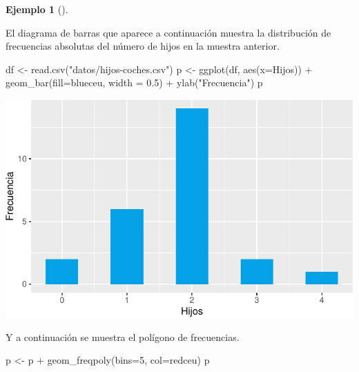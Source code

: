 \documentclass[
  a4paper,
]{scrreport}
\newenvironment{Shaded}{\begin{snugshade}}{\end{snugshade}}
\newcommand{\AttributeTok}[1]{\textcolor[rgb]{0.40,0.45,0.13}{#1}}
\newcommand{\DecValTok}[1]{\textcolor[rgb]{0.68,0.00,0.00}{#1}}
\newcommand{\FloatTok}[1]{\textcolor[rgb]{0.68,0.00,0.00}{#1}}
\newcommand{\FunctionTok}[1]{\textcolor[rgb]{0.28,0.35,0.67}{#1}}
\newcommand{\NormalTok}[1]{\textcolor[rgb]{0.00,0.23,0.31}{#1}}
\newcommand{\OtherTok}[1]{\textcolor[rgb]{0.00,0.23,0.31}{#1}}
\newcommand{\SpecialCharTok}[1]{\textcolor[rgb]{0.37,0.37,0.37}{#1}}
\newcommand{\StringTok}[1]{\textcolor[rgb]{0.13,0.47,0.30}{#1}}
\theoremstyle{plain}
\theoremstyle{definition}
\theoremstyle{definition}
\newtheorem{example}{Ejemplo}[chapter]
\theoremstyle{remark}
\begin{document}
\begin{example}[]\protect\hypertarget{exm-diagrama-barras}{}\label{exm-diagrama-barras}

El diagrama de barras que aparece a continuación muestra la distribución
de frecuencias absolutas del número de hijos en la muestra anterior.

\begin{Shaded}
\begin{Highlighting}[]
\NormalTok{df }\OtherTok{\textless{}{-}} \FunctionTok{read.csv}\NormalTok{(}\StringTok{"datos/hijos{-}coches.csv"}\NormalTok{)}
\NormalTok{p }\OtherTok{\textless{}{-}} \FunctionTok{ggplot}\NormalTok{(df, }\FunctionTok{aes}\NormalTok{(}\AttributeTok{x=}\NormalTok{Hijos)) }\SpecialCharTok{+} 
    \FunctionTok{geom\_bar}\NormalTok{(}\AttributeTok{fill=}\NormalTok{blueceu, }\AttributeTok{width =} \FloatTok{0.5}\NormalTok{) }\SpecialCharTok{+}
    \FunctionTok{ylab}\NormalTok{(}\StringTok{"Frecuencia"}\NormalTok{)}
\NormalTok{p}
\end{Highlighting}
\end{Shaded}

\includegraphics{02-estadistica-descriptiva_files/figure-pdf/diagrama-barras-1.pdf}

Y a continuación se muestra el polígono de frecuencias.

\begin{Shaded}
\begin{Highlighting}[]
\NormalTok{p }\OtherTok{\textless{}{-}}\NormalTok{ p }\SpecialCharTok{+}  
    \FunctionTok{geom\_freqpoly}\NormalTok{(}\AttributeTok{bins=}\DecValTok{5}\NormalTok{, }\AttributeTok{col=}\NormalTok{redceu)}
\NormalTok{p}
\end{Highlighting}
\end{Shaded}


\end{example}
\end{document}
